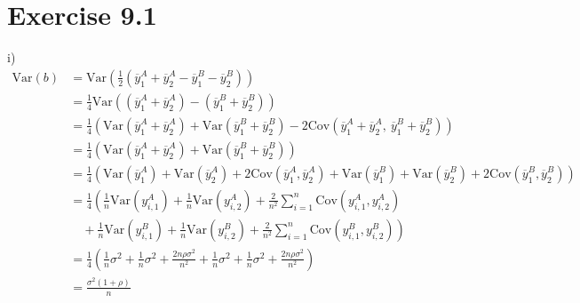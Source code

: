 \documentclass[a4paper]{article}
\newcommand{\Var}{\mathrm{Var}}
\newcommand{\Cov}{\mathrm{Cov}}
\begin{document}
\section{Exercise 9.1}
i)
\begin{align*}
\Var(b) &= \Var\left(\frac{1}{2}\left(\overline{y}_{1}^{A}+\overline{y}_{2}^{A}-\overline{y}_{1}^{B}-\overline{y}_{2}^{B}\right)\right)\\
&= \frac{1}{4}\Var\left(\left(\overline{y}_{1}^{A}+\overline{y}_{2}^{A}\right) -\left(\overline{y}_{1}^{B}+\overline{y}_{2}^{B}\right)\right)\\
&= \frac{1}{4}\left(\Var\left(\overline{y}_{1}^{A}+\overline{y}_{2}^{A}\right) + \Var\left(\overline{y}_{1}^{B}+\overline{y}_{2}^{B}\right) -2\Cov\left(\overline{y}_{1}^{A}+\overline{y}_{2}^{A},~ \overline{y}_{1}^{B}+\overline{y}_{2}^{B}\right)\right)\\
&= \frac{1}{4}\left(\Var\left(\overline{y}_{1}^{A}+\overline{y}_{2}^{A}\right) + \Var\left(\overline{y}_{1}^{B}+\overline{y}_{2}^{B}\right)\right)\\
&= \frac{1}{4}\left(\Var\left(\overline{y}_{1}^{A}\right)+\Var\left(\overline{y}_{2}^{A}\right) +2\Cov\left(\overline{y}_{1}^{A}, \overline{y}_{2}^{A}\right) + \Var\left(\overline{y}_{1}^{B}\right)+\Var\left(\overline{y}_{2}^{B}\right) +2\Cov\left(\overline{y}_{1}^{B}, \overline{y}_{2}^{B}\right)\right)\\
&= \frac{1}{4}\left(\frac{1}{n}\Var\left(y_{i,1}^{A}\right)+\frac{1}{n}\Var\left(y_{i,2}^{A}\right) +\frac{2}{n^{2}}\sum_{i=1}^{n}\Cov\left(y_{i,1}^{A}, y_{i,2}^{A}\right)\right.\\
&\quad +\left. \frac{1}{n}\Var\left(y_{i,1}^{B}\right)+\frac{1}{n}\Var\left(y_{i,2}^{B}\right) +\frac{2}{n^{2}}\sum_{i=1}^{n}\Cov\left(y_{i,1}^{B}, y_{i,2}^{B}\right) \right)\\
&= \frac{1}{4}\left(\frac{1}{n}\sigma^{2}+\frac{1}{n}\sigma^{2} +\frac{2n\rho\sigma^{2}}{n^{2}}+ \frac{1}{n}\sigma^{2}+\frac{1}{n}\sigma^{2} +\frac{2n\rho\sigma^{2}}{n^{2}}\right)\\
&= \frac{\sigma^{2}(1+\rho)}{n}
\end{align*}
\end{document}
